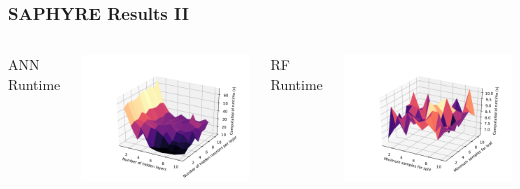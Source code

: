 \documentclass{beamer}
\begin{document}
\begin{frame}
\frametitle{SAPHYRE Results II}
\begin{columns}[c]
\begin{center}
ANN Runtime
\end{center}
\includegraphics[width=\textwidth]{saphyre/ANN/sgd_runtime}
\begin{center}
RF Runtime
\end{center}
\includegraphics[width=\textwidth]{saphyre/RFR/entropy_runtime}
\end{columns}
\end{frame}
\end{document}
